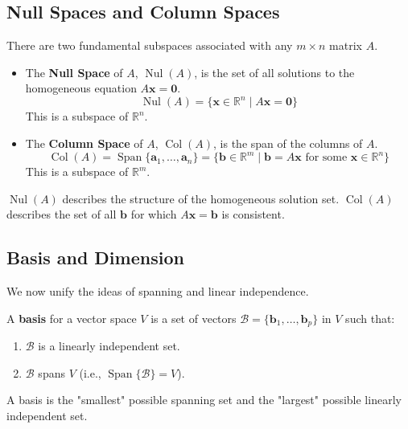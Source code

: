 \subsection{Null Spaces and Column Spaces}
There are two fundamental subspaces associated with any $m \times n$ matrix $A$.

\begin{definition}
\begin{itemize}
    \item The \textbf{Null Space} of $A$, $\operatorname{Nul}(A)$, is the set of all solutions to the homogeneous equation $A\mathbf{x} = \mathbf{0}$.
    \[ \operatorname{Nul}(A) = \{ \mathbf{x} \in \mathbb{R}^n \mid A\mathbf{x} = \mathbf{0} \} \]
    This is a subspace of $\mathbb{R}^n$.
    
    \item The \textbf{Column Space} of $A$, $\operatorname{Col}(A)$, is the span of the columns of $A$.
    \[ \operatorname{Col}(A) = \operatorname{Span}\{\mathbf{a}_1, \ldots, \mathbf{a}_n\} = \{ \mathbf{b} \in \mathbb{R}^m \mid \mathbf{b} = A\mathbf{x} \text{ for some } \mathbf{x} \in \mathbb{R}^n \} \]
    This is a subspace of $\mathbb{R}^m$.
\end{itemize}
\end{definition}

$\operatorname{Nul}(A)$ describes the structure of the homogeneous solution set.
$\operatorname{Col}(A)$ describes the set of all $\mathbf{b}$ for which $A\mathbf{x} = \mathbf{b}$ is consistent.

\subsection{Basis and Dimension}
We now unify the ideas of spanning and linear independence.

\begin{definition}
A \textbf{basis} for a vector space $V$ is a set of vectors $\mathcal{B} = \{\mathbf{b}_1, \ldots, \mathbf{b}_p\}$ in $V$ such that:
\begin{enumerate}
    \item $\mathcal{B}$ is a linearly independent set.
    \item $\mathcal{B}$ spans $V$ (i.e., $\operatorname{Span}\{\mathcal{B}\} = V$).
\end{enumerate}
\end{definition}
A basis is the "smallest" possible spanning set and the "largest" possible linearly independent set.

